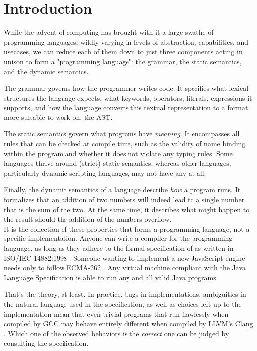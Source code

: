 
\chapter{\label{ch:introduction}Introduction}


While the advent of computing has brought with it a large swathe of programming languages, wildly varying in levels of abstraction, capabilities, and usecases, we can reduce each of them down to just three components acting in unison to form a "programming language": the grammar, the static semantics, and the dynamic semantics.

The grammar governs how the programmer writes code. It specifies what lexical structures the language expects, what keywords, operators, literals, expressions it supports, and how the language converts this textual representation to a format more suitable to work on, the \ac{AST}.

The static semantics govern what programs have \textit{meaning}. It encompasses all rules that can be checked at compile time, such as the validity of name binding within the program and whether it does not violate any typing rules. Some languages thrive around (strict) static semantics, whereas other languages, particularly dynamic scripting languages, may not have any at all.

Finally, the dynamic semantics of a language describe \textit{how} a program runs. It formalizes that an addition of two numbers will indeed lead to a single number that is the sum of the two. At the same time, it describes what might happen to the result should the addition of the numbers overflow.\\


It is the collection of these properties that forms a programming language, not a specific implementation. Anyone can write a compiler for the  programming language, as long as they adhere to the formal specification of  as written in ISO/IEC 14882:1998 \cite{ISO:1998:IIP}. Someone wanting to implement a new JavaScript engine needs only to follow ECMA-262 \cite{ecma1999262}. Any virtual machine compliant with the Java Language Specification \cite{10.5555/2636997} is able to run any and all valid Java programs.

That's the theory, at least. In practice, bugs in implementations, ambiguities in the natural language used in the specification, as well as choices left up to the implementation mean that even trivial \Cplusplus programs that run flawlessly when compiled by GCC \cite{gcc} may behave entirely different when compiled by LLVM's Clang \cite{clang}. Which one of the observed behaviors is the \textit{correct} one can be judged by consulting the specification.

